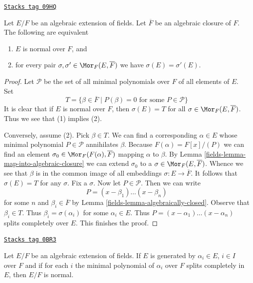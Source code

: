 \begin{lemma}
\label{fields-lemma-characterize-normal}
\href{https://stacks.math.columbia.edu/tag/09HQ}{\texttt{Stacks tag 09HQ}}

Let $E/F$ be an algebraic extension of fields. Let $\overline{F}$ be an
algebraic closure of $F$. The following are equivalent
\begin{enumerate}
\item $E$ is normal over $F$, and
\item for every pair $\sigma, \sigma' \in \Mor_F(E, \overline{F})$ we
have $\sigma(E) = \sigma'(E)$.
\end{enumerate}
\end{lemma}

\begin{proof}

Let $\mathcal{P}$ be the set of all minimal polynomials over $F$ of
all elements of $E$. Set
$$
T =
\{\beta \in \overline{F} \mid P(\beta) = 0\text{ for some }P \in \mathcal{P}\}
$$
It is clear that if $E$ is normal over $F$, then $\sigma(E) = T$
for all $\sigma \in \Mor_F(E, \overline{F})$. Thus we see that (1)
implies (2).

\medskip\noindent
Conversely, assume (2). Pick $\beta \in T$.
We can find a corresponding $\alpha \in E$ whose minimal polynomial
$P \in \mathcal{P}$ annihilates $\beta$. Because $F(\alpha) = F[x]/(P)$
we can find an element $\sigma_0 \in \Mor_F(F(\alpha), \overline{F})$ mapping
$\alpha$ to $\beta$. By Lemma \ref{fields-lemma-map-into-algebraic-closure}
we can extend $\sigma_0$ to a $\sigma \in \Mor_F(E, \overline{F})$.
Whence we see that $\beta$ is in the common image of all embeddings
$\sigma : E \to \overline{F}$. It follows that $\sigma(E) = T$
for any $\sigma$. Fix a $\sigma$. Now let $P \in \mathcal{P}$. Then we
can write
$$
P = (x - \beta_1) \ldots (x - \beta_n)
$$
for some $n$ and $\beta_i \in \overline{F}$ by
Lemma \ref{fields-lemma-algebraically-closed}. Observe that $\beta_i \in T$.
Thus $\beta_i = \sigma(\alpha_i)$ for some $\alpha_i \in E$. Thus
$P = (x - \alpha_1) \ldots (x - \alpha_n)$ splits completely over $E$.
This finishes the proof.
\end{proof}

\begin{lemma}
\label{fields-lemma-normally-generated}
\href{https://stacks.math.columbia.edu/tag/0BR3}{\texttt{Stacks tag 0BR3}}

Let $E/F$ be an algebraic extension of fields.
If $E$ is generated by $\alpha_i \in E$, $i \in I$
over $F$ and if for each $i$ the minimal polynomial
of $\alpha_i$ over $F$ splits completely in $E$, then
$E/F$ is normal.
\end{lemma}


